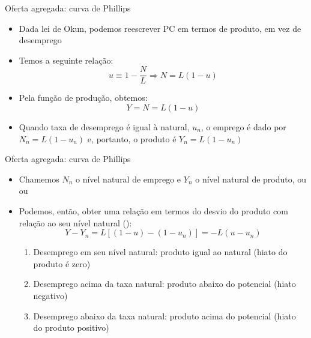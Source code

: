 \documentclass[10pt]{beamer}
\begin{document}
\begin{frame}
    {Oferta agregada: curva de Phillips}
    \begin{itemize}
        \item Dada lei de Okun, podemos reescrever PC em termos de produto, em vez de desemprego\bigskip
        \item Temos a seguinte relação:
        \[
            u \equiv 1 - \frac{N}{L} \Rightarrow N = L(1 - u)
        \]
        \item Pela função de produção, obtemos:
        \[
            Y = N = L(1 - u)
        \]
        \item Quando taxa de desemprego é igual à natural, $u_n$, o emprego é dado por $N_n = L(1-u_n)$ e, portanto, o produto é $Y_n = L(1 - u_n)$        
    \end{itemize}
\end{frame}

\begin{frame}
    {Oferta agregada: curva de Phillips}
    \begin{itemize}
        \item Chamemos $N_n$ o nível natural de emprego e $Y_n$ o nível natural de produto, ou  ou \bigskip
        \item Podemos, então, obter uma relação em termos do desvio do produto com relação ao seu nível natural ():
        \begin{equation}
            Y - Y_n = L[(1 - u) - (1 - u_n)] = -L(u - u_n)
        \end{equation}
        \begin{enumerate}
            \item Desemprego em seu nível natural: produto igual ao natural (hiato do produto é zero)\medskip
            \item Desemprego acima da taxa natural: produto abaixo do potencial (hiato negativo)\medskip
            \item Desemprego abaixo da taxa natural: produto acima do potencial (hiato do produto positivo)
        \end{enumerate}
    \end{itemize}
\end{frame}
\end{document}
